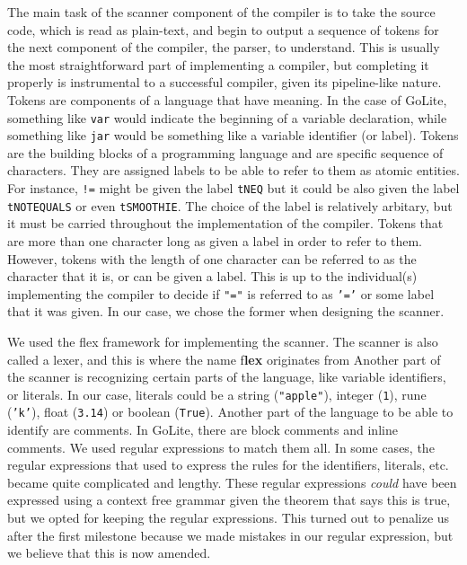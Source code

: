 \documentclass{article}
\begin{document}
The main task of the scanner component of the compiler is to take the source code, which is read as plain-text, and begin to output a sequence of tokens for the next component of the compiler, the parser, to understand. This is usually the most straightforward part of implementing a compiler, but completing it properly is instrumental to a successful compiler, given its pipeline-like nature. Tokens are components of a language that have meaning. In the case of GoLite, something like \texttt{var} would indicate the beginning of a variable declaration, while something like \texttt{jar} would be something like a variable identifier (or label). Tokens are the building blocks of a programming language and are specific sequence of characters. They are assigned labels to be able to refer to them as atomic entities. For instance, \texttt{!=} might be given the label \texttt{tNEQ} but it could be also given the label \texttt{tNOTEQUALS} or even \texttt{tSMOOTHIE}. The choice of the label is relatively arbitary, but it must be carried throughout the implementation of the compiler. Tokens that are more than one character long as given a label in order to refer to them. However, tokens with the length of one character can be referred to as the character that it is, or can be given a label. This is up to the individual(s) implementing the compiler to decide if \texttt{"="} is referred to as \texttt{'='} or some label that it was given. In our case, we chose the former when designing the scanner.

We used the flex framework for implementing the scanner. The scanner is also called a lexer, and this is where the name f\textbf{lex} originates from
Another part of the scanner is recognizing certain parts of the language, like variable identifiers, or literals. In our case, literals could be a string (\texttt{"apple"}), integer (\texttt{1}), rune (\texttt{'k'}), float (\texttt{3.14}) or boolean (\texttt{True}). Another part of the language to be able to identify are comments. In GoLite, there are block comments and inline comments. We used regular expressions to match them all. In some cases, the regular expressions that used to express the rules for the identifiers, literals, etc. became quite complicated and lengthy. These regular expressions \textit{could} have been expressed using a context free grammar given the theorem that says this is true, but we opted for keeping the regular expressions. This turned out to penalize us after the first milestone because we made mistakes in our regular expression, but we believe that this is now amended.
\end{document}
